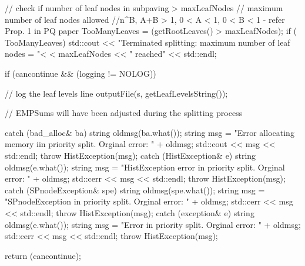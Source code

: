 \begin{DoxyCode}
{{{        
        // check if number of leaf nodes in subpaving > maxLeafNodes
        // maximum number of leaf nodes allowed
        //n^B, A+B > 1, 0  < A < 1, 0 < B < 1 - refer Prop. 1 in PQ paper
        TooManyLeaves = (getRootLeaves() > maxLeafNodes);
        if ( TooManyLeaves) {
          std::cout << "Terminated splitting: maximum number of leaf nodes = "<
      < maxLeafNodes << " reached"
                          << std::endl;
        }
      
  }
         
         
        if (cancontinue && (logging != NOLOG)) {
            // log the leaf levels line
            outputFile(s, getLeafLevelsString());

        }

        // EMPSums will have been adjusted during the splitting process
   }

    catch (bad_alloc& ba) {
        string oldmsg(ba.what());
        string msg = "Error allocating memory iin priority split.  Orginal
       error: "
                                    + oldmsg;
        std::cout << msg << std::endl;
        throw HistException(msg);
    }
    catch (HistException& e) {
        string oldmsg(e.what());
        string msg = "HistException error in priority split.  Orginal error: "
                                    + oldmsg;
        std::cerr << msg << std::endl;
        throw HistException(msg);
    }
    catch (SPnodeException& spe) {
        string oldmsg(spe.what());
        string msg = "SPnodeException in priority split.  Orginal error: "
                                    + oldmsg;
        std::cerr << msg << std::endl;
        throw HistException(msg);
    }
    catch (exception& e) {
        string oldmsg(e.what());
        string msg = "Error in priority split.  Orginal error: " + oldmsg;
        std::cerr << msg << std::endl;
        throw HistException(msg);
    }

    return (cancontinue);
}
\end{DoxyCode}
